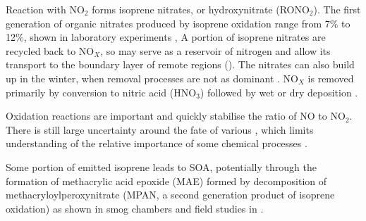     Reaction with NO$_2$ forms isoprene nitrates, or hydroxynitrate (RONO$_2$).
    The first generation of organic nitrates produced by isoprene oxidation range from 7\% to 12\%, shown in laboratory experiments \citep{Paulot2009a, Mao2013},
    A portion of isoprene nitrates are recycled back to NO$_X$, so may serve as a reservoir of nitrogen and allow its transport to the boundary layer of remote regions (\cite{Patchen2007,Paulot2009a}).
    The nitrates can also build up in the winter, when removal processes are not as dominant \citep{Lelieveld2009}.
    NO$_X$ is removed primarily by conversion to nitric acid (HNO$_3$) followed by wet or dry deposition \citep{Ayers2006}.
    
    Oxidation reactions are important and quickly stabilise the ratio of NO to NO$_2$. 
    There is still large uncertainty around the fate of various \roo, which limits understanding of the relative importance of some chemical processes \citep{Crounse2013}.
    
    Some portion of emitted isoprene leads to SOA, potentially through the formation of methacrylic acid epoxide (MAE) formed by decomposition of methacryloylperoxynitrate (MPAN, a second generation product of isoprene oxidation) as shown in smog chambers and field studies in \cite{Lin2013}.
    
